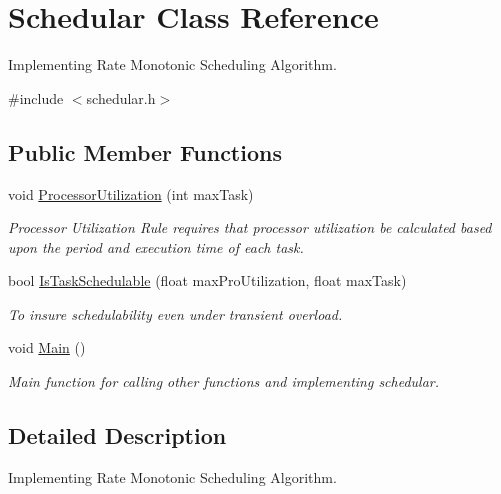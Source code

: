 \hypertarget{classSchedular}{\section{Schedular Class Reference}
\label{classSchedular}
}


Implementing Rate Monotonic Scheduling Algorithm.  




{\ttfamily \#include $<$schedular.\-h$>$}

\subsection*{Public Member Functions}
\begin{DoxyCompactItemize}
\item 
void \hyperlink{classSchedular_a1f7fbcdc2aa6432f96bad813c8ab14f3}{Processor\-Utilization} (int max\-Task)
\begin{DoxyCompactList}\small\item\em Processor Utilization Rule requires that processor utilization be calculated based upon the period and execution time of each task. \end{DoxyCompactList}\item 
bool \hyperlink{classSchedular_ac401612689533e76bc9b9cdb2ac347b6}{Is\-Task\-Schedulable} (float max\-Pro\-Utilization, float max\-Task)
\begin{DoxyCompactList}\small\item\em To insure schedulability even under transient overload. \end{DoxyCompactList}\item 
\hypertarget{classSchedular_a56d368a0eb92ff5801a0f5bed8df4c4a}{void \hyperlink{classSchedular_a56d368a0eb92ff5801a0f5bed8df4c4a}{Main} ()}\label{classSchedular_a56d368a0eb92ff5801a0f5bed8df4c4a}

\begin{DoxyCompactList}\small\item\em Main function for calling other functions and implementing schedular. \end{DoxyCompactList}\end{DoxyCompactItemize}


\subsection{Detailed Description}
Implementing Rate Monotonic Scheduling Algorithm. 

